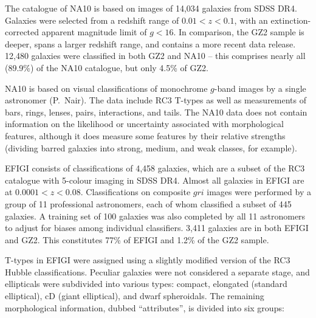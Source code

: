 \documentclass[useAMS,usenatbib]{mn2e}
\begin{document}
The catalogue of NA10 is based on images of 14,034 galaxies from SDSS DR4. Galaxies were selected from a redshift range of $0.01<z<0.1$, with an extinction-corrected apparent magnitude limit of $g<16$. In comparison, the GZ2 sample is deeper, spans a larger redshift range, and contains a more recent data release. 12,480 galaxies were classified in both GZ2 and NA10 -- this comprises nearly all (89.9\%) of the NA10 catalogue, but only 4.5\% of GZ2. 

NA10 is based on visual classifications of monochrome $g$-band images by a single astronomer (P.~Nair). The data include RC3 T-types \citep[a numerical index of a galaxy's stage along the Hubble sequence;][]{dev91} as well as measurements of bars, rings, lenses, pairs, interactions, and tails. The NA10 data does not contain information on the likelihood or uncertainty associated with morphological features, although it does measure some features by their relative strengths (dividing barred galaxies into strong, medium, and weak classes, for example). 


EFIGI consists of classifications of 4,458 galaxies, which are a subset of the RC3 catalogue with 5-colour imaging in SDSS DR4. Almost all galaxies in EFIGI are at $0.0001<z<0.08$. Classifications on composite $gri$ images were performed by a group of 11 professional astronomers, each of whom classified a subset of 445 galaxies. A training set of 100 galaxies was also completed by all 11 astronomers to adjust for biases among individual classifiers. 3,411 galaxies are in both EFIGI and GZ2. This constitutes 77\% of EFIGI and 1.2\% of the GZ2 sample. 

T-types in EFIGI were assigned using a slightly modified version of the RC3 Hubble classifications. Peculiar galaxies were not considered a separate stage, and ellipticals were subdivided into various types: compact, elongated (standard elliptical), cD (giant elliptical), and dwarf spheroidals. The remaining morphological information, dubbed ``attributes'', is divided into six groups:
\end{document}
